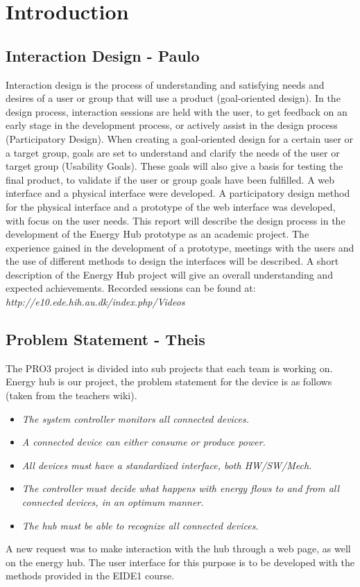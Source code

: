 \chapter{Introduction}
\section{Interaction Design - Paulo}
Interaction design is the process of understanding and satisfying needs and desires of a user or group that will use a product (goal-oriented design). In the design process, interaction sessions are held with the user, to get feedback on an early stage in the development process, or actively assist in the design process (Participatory Design).
When creating a goal-oriented design for a certain user or a target group, goals are set to understand and clarify the needs of the user or target group (Usability Goals). These goals will also give a basis for testing the final product, to validate if the user or group goals have been fulfilled.
\p
A web interface and a physical interface were developed. A participatory design method for the physical interface and a prototype of the web interface was developed, with focus on the user needs.
\p
This report will describe the design process in the development of the Energy Hub prototype as an academic project. The experience gained in the development of a prototype, meetings with the users and the use of different methods to design the interfaces will be described. A short description of the Energy Hub project will give an overall understanding and expected achievements.
\p
Recorded sessions can be found at: \textit{http://e10.ede.hih.au.dk/index.php/Videos}
\section{Problem Statement - Theis}
The PRO3 project is divided into sub projects that each team is working on. Energy hub is our project, the problem statement for the device is as follows (taken from the teachers wiki).
\begin{itemize}
	\item\textit{The system controller monitors all connected devices.}
	\item\textit{A connected device can either consume or produce power.}
	\item\textit{All devices must have a standardized interface, both HW/SW/Mech.}
	\item\textit{The controller must decide what happens with energy flows to and from all connected devices, in an optimum manner.}
	\item\textit{The hub must be able to recognize all connected devices.}
\end{itemize}
A new request was to make interaction with the hub through a web page, as well on the energy hub. The user interface for this purpose is to be developed with the methods provided in the EIDE1 course.


